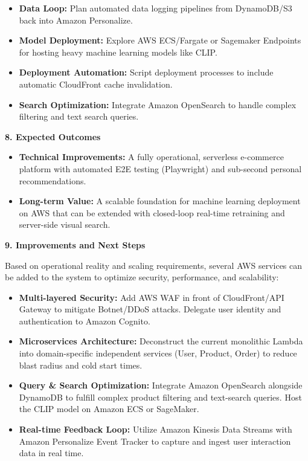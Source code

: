 \begin{itemize}
\tightlist
\item
  \textbf{Data Loop:} Plan automated data logging pipelines from
  DynamoDB/S3 back into Amazon Personalize.
\item
  \textbf{Model Deployment:} Explore AWS ECS/Fargate or Sagemaker
  Endpoints for hosting heavy machine learning models like CLIP.
\item
  \textbf{Deployment Automation:} Script deployment processes to include
  automatic CloudFront cache invalidation.
\item
  \textbf{Search Optimization:} Integrate Amazon OpenSearch to handle
  complex filtering and text search queries.
\end{itemize}

\vspace{0.5em}\noindent\textbf{8. Expected Outcomes}\par

\begin{itemize}
\tightlist
\item
  \textbf{Technical Improvements:} A fully operational, serverless
  e-commerce platform with automated E2E testing (Playwright) and
  sub-second personal recommendations.
\item
  \textbf{Long-term Value:} A scalable foundation for machine learning
  deployment on AWS that can be extended with closed-loop real-time
  retraining and server-side visual search.
\end{itemize}

\vspace{0.5em}\noindent\textbf{9. Improvements and Next
Steps}\par

Based on operational reality and scaling requirements, several AWS
services can be added to the system to optimize security, performance,
and scalability:

\begin{itemize}
\tightlist
\item
  \textbf{Multi-layered Security:} Add AWS WAF in front of
  CloudFront/API Gateway to mitigate Botnet/DDoS attacks. Delegate user
  identity and authentication to Amazon Cognito.
\item
  \textbf{Microservices Architecture:} Deconstruct the current
  monolithic Lambda into domain-specific independent services (User,
  Product, Order) to reduce blast radius and cold start times.
\item
  \textbf{Query \& Search Optimization:} Integrate Amazon OpenSearch
  alongside DynamoDB to fulfill complex product filtering and
  text-search queries. Host the CLIP model on Amazon ECS or SageMaker.
\item
  \textbf{Real-time Feedback Loop:} Utilize Amazon Kinesis Data Streams
  with Amazon Personalize Event Tracker to capture and ingest user
  interaction data in real time.
\end{itemize}
